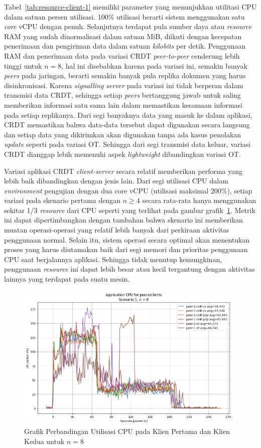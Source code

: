 Tabel~\ref{tab:resource-client-1} memiliki parameter yang menunjukkan utilitasi CPU dalam satuan persen utilisasi. 100\% utilisasi berarti sistem menggunakan satu \textit{core} vCPU dengan penuh. Selanjutnya terdapat pula sumber daya atau \textit{resource} RAM yang sudah dinormalisasi dalam satuan MiB, diikuti dengan kecepatan penerimaan dan pengiriman data dalam satuan \textit{kilobits} per detik. Penggunaan RAM dan penerimaan data pada variasi CRDT \textit{peer-to-peer} cenderung lebih tinggi untuk $n = 8$, hal ini disebabkan karena pada variasi ini, semakin banyak \textit{peers} pada jaringan, berarti semakin banyak pula replika dokumen yang harus disinkronisasi. Karena \textit{signalling server} pada variasi ini tidak berperan dalam transmisi data CRDT, sehingga setiap \textit{peers} bertanggung jawab untuk saling memberikan informasi satu sama lain dalam memastikan kesamaan informasi pada setiap replikanya. Dari segi banyaknya data yang masuk ke dalam aplikasi, CRDT memastikan bahwa data-data tersebut dapat digunakan secara langsung dan setiap data yang dikirimkan akan digunakan tanpa ada kasus penolakan \textit{update} seperti pada variasi OT. Sehingga dari segi transmisi data keluar, variasi CRDT dianggap lebih memenuhi aspek \textit{lightweight} dibandingkan variasi OT.

Variasi aplikasi CRDT \textit{client-server} secara relatif memberikan performa yang lebih baik dibandingkan dengan jenis lain. Dari segi utilisasi CPU dalam \textit{environment} pengujian dengan dua core vCPU (utilisasi maksimal 200\%), setiap variasi pada skenario pertama dengan $n \geq 4$ secara rata-rata hanya menggunakan sekitar 1/3 \textit{resource} dari CPU seperti yang terlihat pada gambar grafik~\ref{fig:2-19}. Metrik ini dapat dipertimbangkan dengan tambahan bahwa skenario ini memberikan muatan operasi-operasi yang relatif lebih banyak dari perkiraan aktivitas penggunaan normal. Selain itu, sistem operasi secara optimal akan menentukan proses yang harus diutamakan baik dari segi memori dan prioritas penggunaan CPU saat berjalannya aplikasi. Sehingga tidak menutup kemungkinan, penggunaan \textit{resource} ini dapat lebih besar atau kecil tergantung dengan aktivitas lainnya yang terdapat pada suatu mesin.

\begin{figure}
 \centering
 \includegraphics[width=11cm]{./assets/skripsi/benchmark-vis_cell_2_output_19}
 \caption{Grafik Perbandingan Utilisasi CPU pada Klien Pertama dan Klien Kedua untuk $n = 8$}
 \label{fig:2-19}
\end{figure}

